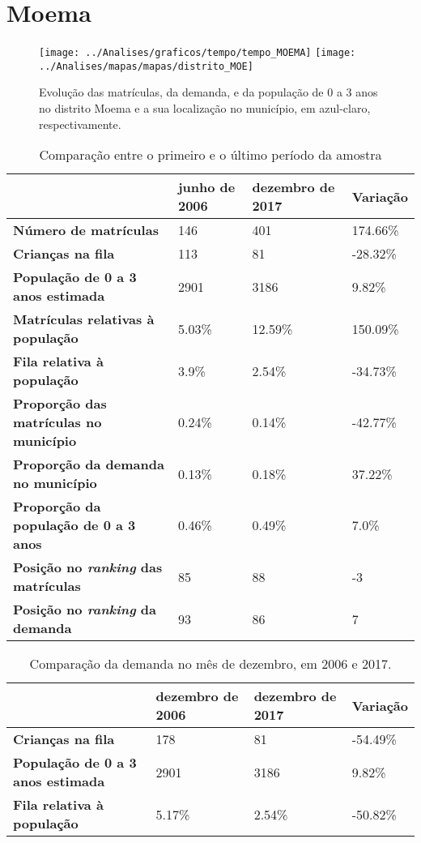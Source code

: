 \section{Moema}
\begin{figure}[H]
\centering
\texttt{[image: ../Analises/graficos/tempo/tempo\_MOEMA]}
\texttt{[image: ../Analises/mapas/mapas/distrito\_MOE]}
\caption{Evolução das matrículas, da demanda, e da população de 0 a 3 anos no distrito Moema e a sua localização no município, em azul-claro, respectivamente.}
\end{figure}
\begin{table}[H]
\begin{tabular}{l|l|l|l}
\textbf{}                                      & \textbf{junho de 2006}       & \textbf{dezembro de 2017}    & \textbf{Variação} \\ \hline
\textbf{Número de matrículas}                  & 146 & 401 & 174.66\% \\ \hline
\textbf{Crianças na fila}                      & 113 & 81 & -28.32\% \\ \hline
\textbf{População de 0 a 3 anos estimada}      & 2901 & 3186 & 9.82\% \\ \hline
\textbf{Matrículas relativas à população}      & 5.03\% & 12.59\% & 150.09\% \\ \hline
\textbf{Fila relativa à população}             & 3.9\% & 2.54\% & -34.73\% \\ \hline
\textbf{Proporção das matrículas no município} & 0.24\% & 0.14\% & -42.77\% \\ \hline
\textbf{Proporção da demanda no município}     & 0.13\% & 0.18\% & 37.22\% \\ \hline
\textbf{Proporção da população de 0 a 3 anos}  & 0.46\% & 0.49\% & 7.0\% \\ \hline
\textbf{Posição no \textit{ranking} das matrículas}     & 85 & 88 & -3 \\ \hline
\textbf{Posição no \textit{ranking} da demanda}         & 93 & 86 & 7 \\ 
\end{tabular}
\caption{Comparação entre o primeiro e o último período da amostra}
\end{table}
\begin{table}[H]
\begin{tabular}{l|l|l|l}
\textbf{}                                 & \textbf{dezembro de 2006} & \textbf{dezembro de 2017} & \textbf{Variação} \\ \hline
\textbf{Crianças na fila}                      & 178 & 81 & -54.49\% \\ \hline
\textbf{População de 0 a 3 anos estimada}      & 2901 & 3186 & 9.82\% \\ \hline
\textbf{Fila relativa à população}             & 5.17\% & 2.54\% & -50.82\% \\
\end{tabular}
\caption{Comparação da demanda no mês de dezembro, em 2006 e 2017.}
\end{table}
